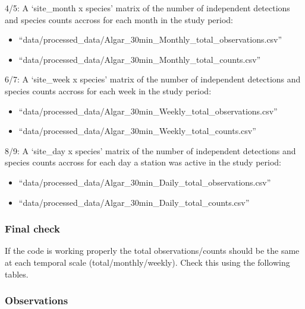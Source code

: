 \documentclass[]{book}
\begin{document}
4/5: A `site\_month x species' matrix of the number of independent
detections and species counts accross for each month in the study
period:

\begin{itemize}
\item
  ``data/processed\_data/Algar\_30min\_Monthly\_total\_observations.csv''
\item
  ``data/processed\_data/Algar\_30min\_Monthly\_total\_counts.csv''
\end{itemize}

6/7: A `site\_week x species' matrix of the number of independent
detections and species counts accross for each week in the study period:

\begin{itemize}
\item
  ``data/processed\_data/Algar\_30min\_Weekly\_total\_observations.csv''
\item
  ``data/processed\_data/Algar\_30min\_Weekly\_total\_counts.csv''
\end{itemize}

8/9: A `site\_day x species' matrix of the number of independent
detections and species counts accross for each day a station was active
in the study period:

\begin{itemize}
\item
  ``data/processed\_data/Algar\_30min\_Daily\_total\_observations.csv''
\item
  ``data/processed\_data/Algar\_30min\_Daily\_total\_counts.csv''
\end{itemize}

\subsubsection{Final check}\label{final-check}

If the code is working properly the total observations/counts should be
the same at each temporal scale (total/monthly/weekly). Check this using
the following tables.

\subsubsection{Observations}\label{observations}
\end{document}
